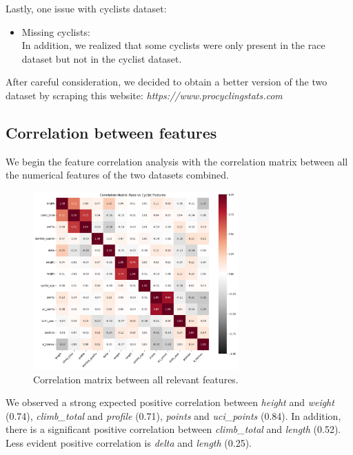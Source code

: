 \documentclass[a4paper, twoside,openright]{report}
\begin{document}
Lastly, one issue with cyclists dataset:
\begin{itemize}
    \item Missing cyclists: \\
    In addition, we realized that some cyclists were only present in the race dataset but not in the cyclist dataset.
\end{itemize}

After careful consideration, we decided to obtain a better version of the two dataset by scraping this website:
\textit{https://www.procyclingstats.com}

\subsection{Correlation between features}
\clearpage
 We begin the feature correlation analysis with the correlation matrix between all the numerical features of the two datasets combined.
\begin{figure}[ht]
    \centering
    \includegraphics[width=0.7\textwidth]{assets/correlation_matrix.png}
    \caption{Correlation matrix between all relevant features.}
    \label{fig:correlation-matrix}
\end{figure}
We observed a strong expected positive correlation between \textit{height} and \textit{weight} (0.74), \textit{climb\_total} and \textit{profile} (0.71), \textit{points} and \textit{uci\_points} (0.84).  In addition, there is a significant positive correlation between  \textit{climb\_total} and  \textit{length} (0.52). Less evident positive correlation is \textit{delta} and \textit{length} (0.25). \\
\end{document}
